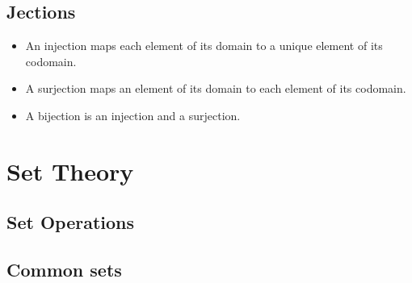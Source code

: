 \documentclass[fleqn,a4paper,11pt]{article}
\begin{document}

    \subsection{Jections}


    \begin{itemize}
    \item An injection maps each element of its domain to a unique element of
          its codomain.
    \item A surjection maps an element of its domain to each element of its
          codomain.
    \item A bijection is an injection and a surjection.
    \end{itemize}

    \section{Set Theory}

    \subsection{Set Operations}

    \subsection{Common sets}

\end{document}
